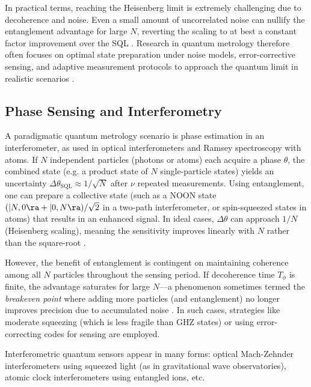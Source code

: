 In practical terms, reaching the Heisenberg limit is extremely
challenging due to decoherence and noise. Even a small amount of
uncorrelated noise can nullify the entanglement advantage for large
$N$, reverting the scaling to at best a constant factor improvement
over the SQL . Research in quantum metrology therefore often focuses
on optimal state preparation under noise models, error-corrective
sensing, and adaptive measurement protocols to approach the quantum
limit in realistic scenarios .



\subsection{Phase Sensing and Interferometry}

A paradigmatic quantum metrology scenario is phase estimation in an
interferometer, as used in optical interferometers and Ramsey
spectroscopy with atoms. If $N$ independent particles (photons or
atoms) each acquire a phase $\theta$, the combined state (e.g. a
product state of $N$ single-particle states) yields an uncertainty
$\Delta\theta_{\text{SQL}} \approx 1/\sqrt{N}$ after $\nu$ repeated
measurements. Using entanglement, one can prepare a collective state
(such as a NOON state $(|N,0\ra + |0,N\ra)/\sqrt{2}$ in a two-path
interferometer, or spin-squeezed states in atoms) that results in an
enhanced signal. In ideal cases, $\Delta\theta$ can approach $1/N$
(Heisenberg scaling), meaning the sensitivity improves linearly with
$N$ rather than the square-root .



However, the benefit of entanglement is contingent on maintaining
coherence among all $N$ particles throughout the sensing period. If
decoherence time $T_{\phi}$ is finite, the advantage saturates for
large $N$—a phenomenon sometimes termed the \textit{breakeven point}
where adding more particles (and entanglement) no longer improves
precision due to accumulated noise . In such cases, strategies like
moderate squeezing (which is less fragile than GHZ states) or using
error-correcting codes for sensing are employed.



Interferometric quantum sensors appear in many forms: optical
Mach-Zehnder interferometers using squeezed light (as in gravitational
wave observatories), atomic clock interferometers using entangled
ions, etc.
                               


